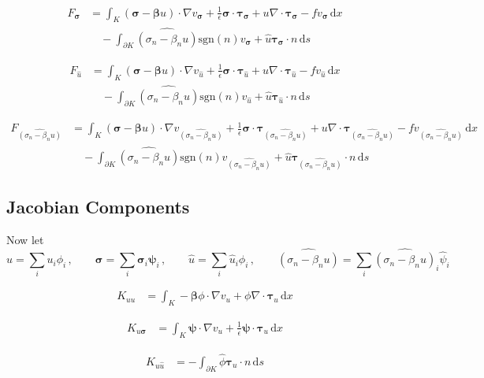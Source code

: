 \documentclass[a4paper]{article}
\def\d{\,\mathrm{d}}
\def\dx{\d x}
\def\ds{\d s}
\def\btau{\boldsymbol\tau}
\def\bsigma{\boldsymbol\sigma}
\def\bbeta{\boldsymbol\beta}
\def\bpsi{\boldsymbol\psi}
\begin{document}
\begin{align*}
F_{\bsigma}&=\int_K
(\bsigma-\bbeta u)\cdot\nabla v_{\bsigma}
+\frac{1}{\epsilon}\bsigma\cdot\btau_{\bsigma}+u\nabla\cdot\btau_{\bsigma}
-fv_{\bsigma}\dx\\
&\quad-\int_{\partial K}
\widehat{(\sigma_n-\beta_nu)}\text{sgn}(n)v_{\bsigma}
+\hat u\btau_{\bsigma}\cdot n\ds
\end{align*}

\begin{align*}
F_{\hat u}&=\int_K
(\bsigma-\bbeta u)\cdot\nabla v_{\hat u}
+\frac{1}{\epsilon}\bsigma\cdot\btau_{\hat u}+u\nabla\cdot\btau_{\hat u}
-fv_{\hat u}\dx\\
&\quad-\int_{\partial K}
\widehat{(\sigma_n-\beta_nu)}\text{sgn}(n)v_{\hat u}
+\hat u\btau_{\hat u}\cdot n\ds
\end{align*}

\begin{align*}
F_{\widehat{(\sigma_n-\beta_nu)}}&=\int_K
(\bsigma-\bbeta u)\cdot\nabla v_{\widehat{(\sigma_n-\beta_nu)}}
+\frac{1}{\epsilon}\bsigma\cdot\btau_{\widehat{(\sigma_n-\beta_nu)}}+u\nabla\cdot\btau_{\widehat{(\sigma_n-\beta_nu)}}
-fv_{\widehat{(\sigma_n-\beta_nu)}}\dx\\
&\quad-\int_{\partial K}
\widehat{(\sigma_n-\beta_nu)}\text{sgn}(n)v_{\widehat{(\sigma_n-\beta_nu)}}
+\hat u\btau_{\widehat{(\sigma_n-\beta_nu)}}\cdot n\ds
\end{align*}

\subsection*{Jacobian Components}
Now let
\[
u=\sum_iu_i\phi_i
\,,\quad\quad
\bsigma=\sum_i\bsigma_i\bpsi_i
\,,\quad\quad
\hat u=\sum_i\hat u_i\hat\phi_i
\,,\quad\quad
\widehat{(\sigma_n-\beta_nu)}=\sum_i\widehat{(\sigma_n-\beta_nu)}_i\hat\psi_i
\]

\begin{align*}
K_{uu}&=\int_K
-\bbeta\phi\cdot\nabla v_u
+\phi\nabla\cdot\btau_u \dx
\end{align*}

\begin{align*}
K_{u\bsigma}&=\int_K
\bpsi\cdot\nabla v_u
+\frac{1}{\epsilon}\bpsi\cdot\btau_u\dx
\end{align*}

\begin{align*}
K_{u\hat u}&=-\int_{\partial K}
\hat\phi\btau_u\cdot n\ds
\end{align*}
\end{document}
